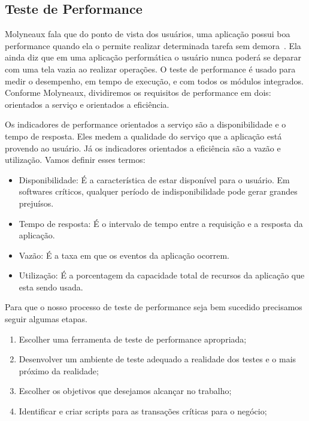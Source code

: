 \subsection{Teste de Performance}

Molyneaux fala que do ponto de vista dos usuários, uma aplicação possui boa performance quando ela o permite realizar determinada tarefa sem demora~\cite{theartoftestperf}. Ela ainda diz que em uma aplicação performática o usuário nunca poderá se deparar com uma tela vazia ao realizar operações. O teste de performance é usado para medir o desempenho, em tempo de execução, e com todos os módulos integrados. Conforme Molyneaux, dividiremos os requisitos de performance em dois: orientados a serviço e orientados a eficiência.%

Os indicadores de performance orientados a serviço são a disponibilidade e o tempo de resposta. Eles medem a qualidade do serviço que a aplicação está provendo ao usuário. Já os indicadores orientados a eficiência são a vazão e utilização. Vamos definir esses termos:

\begin{itemize}
\item Disponibilidade: É a característica de estar disponível para o usuário. Em softwares críticos, qualquer período de indisponibilidade pode gerar grandes prejuísos.
\item Tempo de resposta: É o intervalo de tempo entre a requisição e a resposta da aplicação. 
\item Vazão: É a taxa em que os eventos da aplicação ocorrem.
\item Utilização: É a porcentagem da capacidade total de recursos da aplicação que esta sendo usada.
\end{itemize}

Para que o nosso processo de teste de performance seja bem sucedido precisamos seguir algumas etapas.

\begin{enumerate}
\item Escolher uma ferramenta de teste de performance apropriada;
\item Desenvolver um ambiente de teste adequado a realidade dos testes e o mais próximo da realidade;
\item Escolher os objetivos que desejamos alcançar no trabalho;
\item Identificar e criar scripts para as transações críticas para o negócio;
\end{enumerate}















